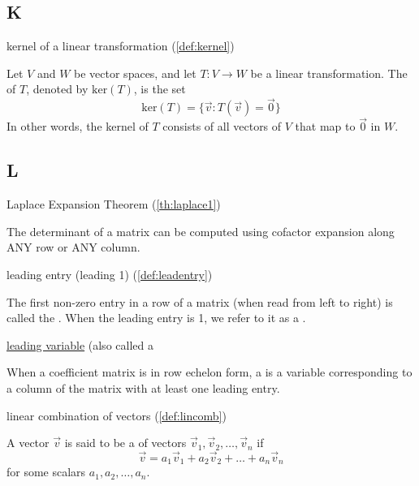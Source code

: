 \documentclass{ximera}
\begin{document}
\subsection*{K}

kernel of a linear transformation (\ref{def:kernel})
\begin{expandable}{}{}
    Let $V$ and $W$ be vector spaces, and let $T:V\rightarrow W$ be a linear transformation.  The  of $T$, denoted by $\mbox{ker}(T)$, is the set
$$\mbox{ker}(T)=\{\vec{v}:T(\vec{v})=\vec{0}\}$$
In other words, the kernel of $T$ consists of all vectors of $V$ that map to $\vec{0}$ in $W$.
\end{expandable}

\subsection*{L}

Laplace Expansion Theorem (\ref{th:laplace1})
\begin{expandable}{}{}
    The determinant of a matrix can be computed using cofactor expansion along ANY row or ANY column.
\end{expandable}

leading entry (leading 1) (\ref{def:leadentry})
\begin{expandable}{}{}
    The first non-zero entry in a row of a matrix (when read from left to right) is called the .  When the leading entry is 1, we refer to it as a .
\end{expandable}

\href{https://ximera.osu.edu/linearalgebradzv3/LinearAlgebraInteractiveIntro/SYS-0020/main}{leading variable} (also called a 
\begin{expandable}{}{}
    When a coefficient matrix is in row echelon form, a  is a variable corresponding to a column of the matrix with at least one leading entry.
\end{expandable}



linear combination of vectors (\ref{def:lincomb})
\begin{expandable}{}{}
    A vector $\vec{v}$ is said to be a  of vectors $\vec{v}_1, \vec{v}_2,\ldots, \vec{v}_n$ if 
$$\vec{v}=a_1\vec{v}_1+ a_2\vec{v}_2+\ldots + a_n\vec{v}_n$$
for some scalars $a_1, a_2, \ldots ,a_n$.
\end{expandable}
\end{document}
